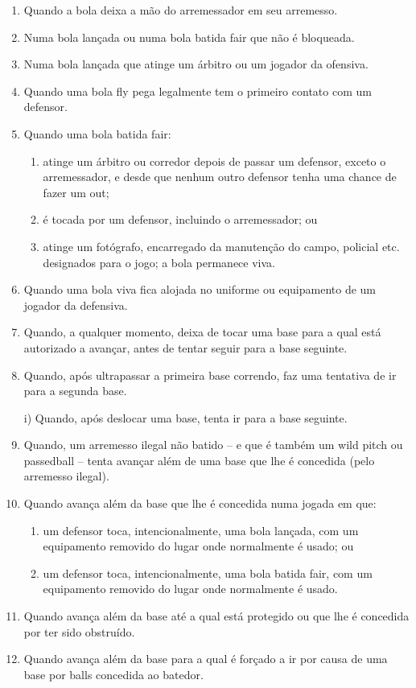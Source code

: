 \begin{enumerate}[label=(\alph*)]\item   Quando a bola deixa a mão do arremessador em seu arremesso.
	\item  Numa bola lançada ou numa bola batida \gls{fair} que não é bloqueada.
	\item  Numa bola lançada que atinge um árbitro ou um jogador da ofensiva.
	\item  Quando uma bola \gls{fly} pega legalmente tem o primeiro contato com um defensor.
	\item  Quando uma bola batida \gls{fair}:

	\begin{enumerate}[label=\roman*.]
		\item  atinge um árbitro ou corredor depois de passar um defensor, exceto o arremessador, e desde que nenhum outro defensor tenha uma chance de	 fazer um \gls{out};
		\item é tocada por um defensor, incluindo o arremessador; ou
		\item atinge um fotógrafo, encarregado da manutenção do campo, policial etc. designados para o jogo; a bola permanece viva.
	\end{enumerate}

	\item  Quando uma bola viva fica alojada no uniforme ou equipamento de um jogador da defensiva.
	\item   Quando, a qualquer momento, deixa de tocar uma base para a qual está autorizado a avançar, antes de tentar seguir para a base seguinte.
	\item   Quando, após ultrapassar a primeira base correndo, faz uma tentativa de ir para a segunda base.

	i) Quando, após deslocar uma base, tenta ir para a base seguinte.

	\item   Quando, um arremesso ilegal não batido -- e que é também um \gls{wild pitch} ou	 \gls{passedball} -- tenta avançar além de uma base que lhe é concedida (pelo arremesso ilegal).

	\item   Quando avança além da base que lhe é concedida numa jogada em que:

	\begin{enumerate}[label=\roman*.]
		\item um defensor toca, intencionalmente, uma bola lançada, com um equipamento removido do lugar onde normalmente é usado; ou
		\item um defensor toca, intencionalmente, uma bola batida \gls{fair}, com um  equipamento removido do lugar onde normalmente é usado.
	\end{enumerate}

	\item Quando avança além da base até a qual está protegido ou que lhe é concedida por ter sido obstruído.
	\item Quando avança além da base para a qual é forçado a ir por causa de uma base por \glspl{ball} concedida ao batedor.

\end{enumerate}

